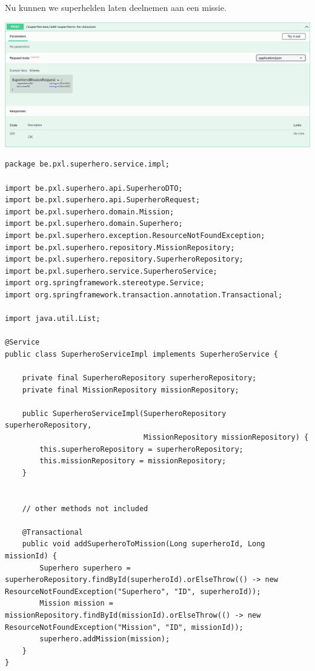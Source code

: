 Nu kunnen we superhelden laten deelnemen aan een missie.

\includegraphics[width=\textwidth]{./images/chapter-jpa/superhero_controller_add_superhero_to_mission}

\begin{lstlisting}
package be.pxl.superhero.service.impl;

import be.pxl.superhero.api.SuperheroDTO;
import be.pxl.superhero.api.SuperheroRequest;
import be.pxl.superhero.domain.Mission;
import be.pxl.superhero.domain.Superhero;
import be.pxl.superhero.exception.ResourceNotFoundException;
import be.pxl.superhero.repository.MissionRepository;
import be.pxl.superhero.repository.SuperheroRepository;
import be.pxl.superhero.service.SuperheroService;
import org.springframework.stereotype.Service;
import org.springframework.transaction.annotation.Transactional;

import java.util.List;

@Service
public class SuperheroServiceImpl implements SuperheroService {

    private final SuperheroRepository superheroRepository;
    private final MissionRepository missionRepository;

    public SuperheroServiceImpl(SuperheroRepository superheroRepository,
                                MissionRepository missionRepository) {
        this.superheroRepository = superheroRepository;
        this.missionRepository = missionRepository;
    }

   
    // other methods not included 

    @Transactional
    public void addSuperheroToMission(Long superheroId, Long missionId) {
        Superhero superhero = superheroRepository.findById(superheroId).orElseThrow(() -> new ResourceNotFoundException("Superhero", "ID", superheroId));
        Mission mission = missionRepository.findById(missionId).orElseThrow(() -> new ResourceNotFoundException("Mission", "ID", missionId));
        superhero.addMission(mission);
    }
}
\end{lstlisting}

